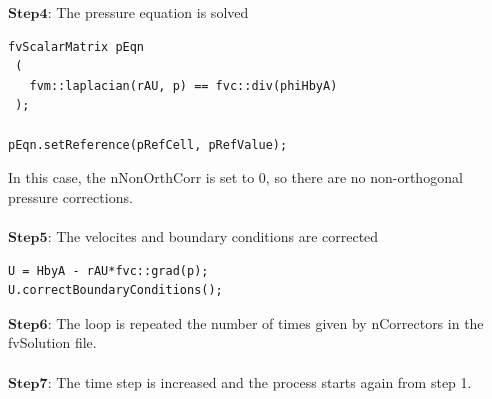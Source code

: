 \documentclass[a4paper,english,11pt,twoside]{article}
\begin{document}
$\mathbf{Step 4}$: The pressure equation is solved
\begin{lstlisting}[style=python]
fvScalarMatrix pEqn
 (
   fvm::laplacian(rAU, p) == fvc::div(phiHbyA)
 );

pEqn.setReference(pRefCell, pRefValue);
\end{lstlisting}
In this case, the nNonOrthCorr is set to 0, so there are no non-orthogonal pressure corrections.\\
\\
$\mathbf{Step 5}$: The velocites and boundary conditions are corrected
\begin{lstlisting}[style=python]
 U = HbyA - rAU*fvc::grad(p);
U.correctBoundaryConditions();
\end{lstlisting}
$\mathbf{Step 6}$: The loop is repeated the number of times given by nCorrectors in the fvSolution file.\\
\\
$\mathbf{Step 7}$: The time step is increased and the process starts again from step 1.
\end{document}
